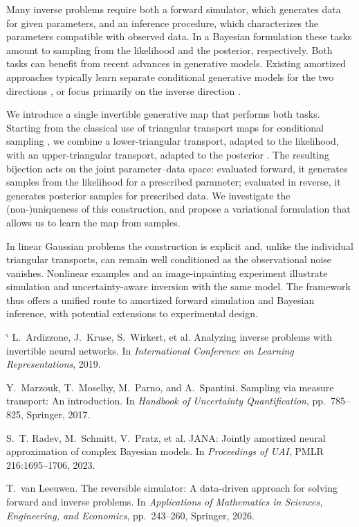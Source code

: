 \documentclass[11pt,a4paper]{article}
\makeatletter
\renewenvironment{thebibliography}[1]
  {\par\medskip{\small\bfseries\color{accent}References\par}\nopagebreak\vspace{-0.3em}%
   \small
   \list{\@biblabel{\@arabic\c@enumiv}}%
        {\settowidth\labelwidth{\@biblabel{#1}}%
         \leftmargin\labelwidth
         \advance\leftmargin\labelsep
         \itemsep 1pt \parsep 0pt \topsep 2pt
         \usecounter{enumiv}%
         \let\p@enumiv\@empty
         \renewcommand\theenumiv{\@arabic\c@enumiv}}%
   \sloppy\clubpenalty4000\widowpenalty4000\sfcode`\.\@m}
  {\def\@noitemerr{\@latex@warning{Empty `thebibliography' environment}}%
   \endlist}
\makeatother
\begin{document}
Many inverse problems require both a forward simulator, which generates data
for given parameters, and an inference procedure, which characterizes the
parameters compatible with observed data. In a Bayesian formulation these
tasks amount to sampling from the likelihood and the posterior, respectively.
Both tasks can benefit from recent advances in generative models. Existing amortized approaches typically learn separate conditional generative models for the two directions
\cite{vl:Radev2023}, or focus primarily on the inverse direction
\cite{vl:Ardizzone2019}.

We introduce a single invertible generative map that performs both tasks.
Starting from the classical use of triangular transport maps for conditional
sampling \cite{vl:Marzouk2017}, we combine a lower-triangular transport, adapted
to the likelihood, with an upper-triangular transport, adapted to the
posterior \cite{vl:vanLeeuwen2026}. The resulting bijection acts on the joint parameter--data space:
evaluated forward, it generates samples from the likelihood for a prescribed
parameter; evaluated in reverse, it generates posterior samples for prescribed
data. We investigate the (non-)uniqueness of this construction, and propose a variational formulation that allows us to learn the map from samples.

In linear Gaussian problems the construction is explicit and,
unlike the individual triangular transports, can remain well conditioned as
the observational noise vanishes. Nonlinear examples and an image-inpainting
experiment illustrate simulation and uncertainty-aware inversion with the
same model. The framework thus offers a unified route to amortized forward
simulation and Bayesian inference, with potential extensions to experimental
design.

\begin{thebibliography}{9}
L.~Ardizzone, J.~Kruse, S.~Wirkert, et al.
\newblock Analyzing inverse problems with invertible neural networks.
\newblock In {\em International Conference on Learning Representations}, 2019.

Y.~Marzouk, T.~Moselhy, M.~Parno, and A.~Spantini.
\newblock Sampling via measure transport: An introduction.
\newblock In {\em Handbook of Uncertainty Quantification}, pp.~785--825,
Springer, 2017.

S.~T. Radev, M.~Schmitt, V.~Pratz, et al.
\newblock JANA: Jointly amortized neural approximation of complex Bayesian
models.
\newblock In {\em Proceedings of UAI}, PMLR 216:1695--1706, 2023.

T.~van Leeuwen.
\newblock The reversible simulator: A data-driven approach for solving forward
and inverse problems.
\newblock In {\em Applications of Mathematics in Sciences, Engineering, and
Economics}, pp.~243--260, Springer, 2026.
\end{thebibliography}
\end{document}
